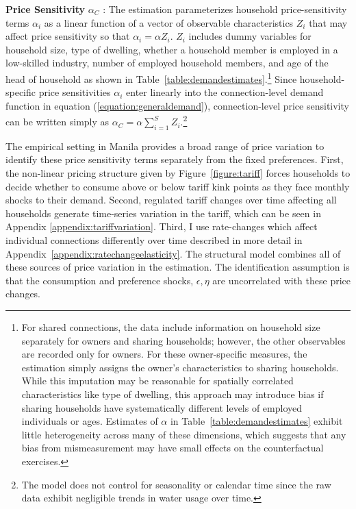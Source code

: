 \documentclass[12pt]{article}
\begin{document}
\textbf{Price Sensitivity} $\alpha_C$  :  The estimation parameterizes household price-sensitivity terms $\alpha_i$ as a linear function of a vector of observable characteristics $Z_i$ that may affect price sensitivity so that $\alpha_i = \alpha Z_i$.  $Z_i$ includes dummy variables for household size, type of dwelling, whether a household member is employed in a low-skilled industry, number of employed household members, and age of the head of household as shown in Table~\ref{table:demandestimates}.\footnote{For shared connections, the data include information on household size separately for owners and sharing households; however, the other observables are recorded only for owners.  For these owner-specific measures, the estimation simply assigns the owner's characteristics to sharing households.  While this imputation may be reasonable for spatially correlated characteristics like type of dwelling, this approach may introduce bias if sharing households have systematically different levels of employed individuals or ages.  Estimates of $\alpha$ in Table~\ref{table:demandestimates} exhibit little heterogeneity across many of these dimensions, which suggests that any bias from mismeasurement may have small effects on the counterfactual exercises.}  Since household-specific price sensitivities $\alpha_i$ enter linearly into the connection-level demand function in equation (\ref{equation:generaldemand}), connection-level price sensitivity can be written simply as $\alpha_C = \alpha \sum_{i=1}^{S} Z_i$.\footnote{The model does not control for seasonality or calendar time since the raw data exhibit negligible trends in water usage over time.}

The empirical setting in Manila provides a broad range of price variation to identify these price sensitivity terms separately from the fixed preferences.  First, the non-linear pricing structure given by Figure~\ref{figure:tariff} forces households to decide whether to consume above or below tariff kink points as they face monthly shocks to their demand.  Second, regulated tariff changes over time affecting all households generate time-series variation in the tariff, which can be seen in Appendix \ref{appendix:tariffvariation}.  Third, I use rate-changes which affect individual connections differently over time described in more detail in Appendix~\ref{appendix:ratechangeelasticity}.  The structural model combines all of these sources of price variation in the estimation.  The identification assumption is that the consumption and preference shocks, $\epsilon,\eta$ are uncorrelated with these price changes.
\end{document}
